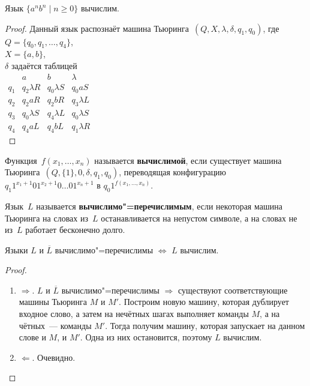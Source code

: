 \begin{statement}
Язык $\{ a^n b^n \mid n \geqslant 0 \}$ вычислим.
\end{statement}
\begin{proof}
Данный язык распознаёт машина Тьюринга~$(Q, X, \lambda, \delta, q_1, q_0)$, где\\
$Q = \{ q_0, q_1, \ldots, q_4 \}$,\\
$X = \{ a, b \}$,\\
$\delta$ задаётся таблицей\\
$\begin{array}{c|c|c|c}
  & a & b & \lambda \\
\hline
q_1 & q_2 \lambda R & q_0 \lambda S & q_0 a S \\
q_2 & q_2 a R & q_2 b R & q_3 \lambda L \\
q_3 & q_0 \lambda S & q_4 \lambda L & q_0 \lambda S \\
q_4 & q_4 a L & q_4 b L & q_1 \lambda R
\end{array}$\\
\end{proof}

 Функция~$f(x_1, \ldots, x_n)$ называется \textbf{вычислимой}, если существует машина Тьюринга~$(Q, \{ 1 \}, 0, \delta, q_1, q_0)$, переводящая конфигурацию~$q_1 1^{x_1 + 1} 0 1^{x_2 + 1} 0 \ldots 0 1^{x_n + 1}$ в $q_0 1^{f(x_1, \ldots, x_n)}$.

 Язык~$L$ называется \textbf{вычислимо"=перечислимым}, если некоторая машина Тьюринга на словах из~$L$ останавливается на непустом символе, а на словах не из~$L$ работает бесконечно долго.

\begin{statement}
Языки $L$ и $\overline L$ вычислимо"=перечислимы $\Leftrightarrow$ $L$ вычислим.
\end{statement}
\begin{proof}
\begin{enumerate}
	\item $\Rightarrow$.
	$L$ и $\overline L$ вычислимо"=перечислимы $\Rightarrow$ существуют соответствующие машины Тьюринга $M$ и $M'$.
	Построим новую машину, которая дублирует входное слово, а затем на нечётных шагах выполняет команды $M$, а на чётных~--- команды $M'$.
	Тогда получим машину, которая запускает на данном слове и $M$, и $M'$.
	Одна из них остановится, поэтому $L$ вычислим.
	
	\item $\Leftarrow$. Очевидно.
\end{enumerate}
\end{proof}

